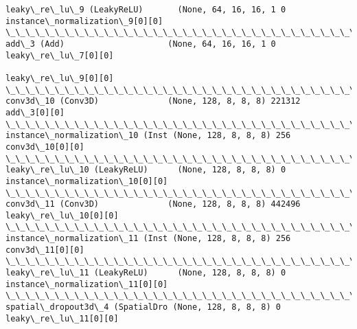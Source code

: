 \documentclass[11pt]{article}
\begin{document}
\begin{Verbatim}[commandchars=\\\{\}]
leaky\_re\_lu\_9 (LeakyReLU)       (None, 64, 16, 16, 1 0           instance\_normalization\_9[0][0]   
\_\_\_\_\_\_\_\_\_\_\_\_\_\_\_\_\_\_\_\_\_\_\_\_\_\_\_\_\_\_\_\_\_\_\_\_\_\_\_\_\_\_\_\_\_\_\_\_\_\_\_\_\_\_\_\_\_\_\_\_\_\_\_\_\_\_\_\_\_\_\_\_\_\_\_\_\_\_\_\_\_\_\_\_\_\_\_\_\_\_\_\_\_\_\_\_\_\_
add\_3 (Add)                     (None, 64, 16, 16, 1 0           leaky\_re\_lu\_7[0][0]              
                                                                 leaky\_re\_lu\_9[0][0]              
\_\_\_\_\_\_\_\_\_\_\_\_\_\_\_\_\_\_\_\_\_\_\_\_\_\_\_\_\_\_\_\_\_\_\_\_\_\_\_\_\_\_\_\_\_\_\_\_\_\_\_\_\_\_\_\_\_\_\_\_\_\_\_\_\_\_\_\_\_\_\_\_\_\_\_\_\_\_\_\_\_\_\_\_\_\_\_\_\_\_\_\_\_\_\_\_\_\_
conv3d\_10 (Conv3D)              (None, 128, 8, 8, 8) 221312      add\_3[0][0]                      
\_\_\_\_\_\_\_\_\_\_\_\_\_\_\_\_\_\_\_\_\_\_\_\_\_\_\_\_\_\_\_\_\_\_\_\_\_\_\_\_\_\_\_\_\_\_\_\_\_\_\_\_\_\_\_\_\_\_\_\_\_\_\_\_\_\_\_\_\_\_\_\_\_\_\_\_\_\_\_\_\_\_\_\_\_\_\_\_\_\_\_\_\_\_\_\_\_\_
instance\_normalization\_10 (Inst (None, 128, 8, 8, 8) 256         conv3d\_10[0][0]                  
\_\_\_\_\_\_\_\_\_\_\_\_\_\_\_\_\_\_\_\_\_\_\_\_\_\_\_\_\_\_\_\_\_\_\_\_\_\_\_\_\_\_\_\_\_\_\_\_\_\_\_\_\_\_\_\_\_\_\_\_\_\_\_\_\_\_\_\_\_\_\_\_\_\_\_\_\_\_\_\_\_\_\_\_\_\_\_\_\_\_\_\_\_\_\_\_\_\_
leaky\_re\_lu\_10 (LeakyReLU)      (None, 128, 8, 8, 8) 0           instance\_normalization\_10[0][0]  
\_\_\_\_\_\_\_\_\_\_\_\_\_\_\_\_\_\_\_\_\_\_\_\_\_\_\_\_\_\_\_\_\_\_\_\_\_\_\_\_\_\_\_\_\_\_\_\_\_\_\_\_\_\_\_\_\_\_\_\_\_\_\_\_\_\_\_\_\_\_\_\_\_\_\_\_\_\_\_\_\_\_\_\_\_\_\_\_\_\_\_\_\_\_\_\_\_\_
conv3d\_11 (Conv3D)              (None, 128, 8, 8, 8) 442496      leaky\_re\_lu\_10[0][0]             
\_\_\_\_\_\_\_\_\_\_\_\_\_\_\_\_\_\_\_\_\_\_\_\_\_\_\_\_\_\_\_\_\_\_\_\_\_\_\_\_\_\_\_\_\_\_\_\_\_\_\_\_\_\_\_\_\_\_\_\_\_\_\_\_\_\_\_\_\_\_\_\_\_\_\_\_\_\_\_\_\_\_\_\_\_\_\_\_\_\_\_\_\_\_\_\_\_\_
instance\_normalization\_11 (Inst (None, 128, 8, 8, 8) 256         conv3d\_11[0][0]                  
\_\_\_\_\_\_\_\_\_\_\_\_\_\_\_\_\_\_\_\_\_\_\_\_\_\_\_\_\_\_\_\_\_\_\_\_\_\_\_\_\_\_\_\_\_\_\_\_\_\_\_\_\_\_\_\_\_\_\_\_\_\_\_\_\_\_\_\_\_\_\_\_\_\_\_\_\_\_\_\_\_\_\_\_\_\_\_\_\_\_\_\_\_\_\_\_\_\_
leaky\_re\_lu\_11 (LeakyReLU)      (None, 128, 8, 8, 8) 0           instance\_normalization\_11[0][0]  
\_\_\_\_\_\_\_\_\_\_\_\_\_\_\_\_\_\_\_\_\_\_\_\_\_\_\_\_\_\_\_\_\_\_\_\_\_\_\_\_\_\_\_\_\_\_\_\_\_\_\_\_\_\_\_\_\_\_\_\_\_\_\_\_\_\_\_\_\_\_\_\_\_\_\_\_\_\_\_\_\_\_\_\_\_\_\_\_\_\_\_\_\_\_\_\_\_\_
spatial\_dropout3d\_4 (SpatialDro (None, 128, 8, 8, 8) 0           leaky\_re\_lu\_11[0][0]             

\end{Verbatim}
\end{document}
